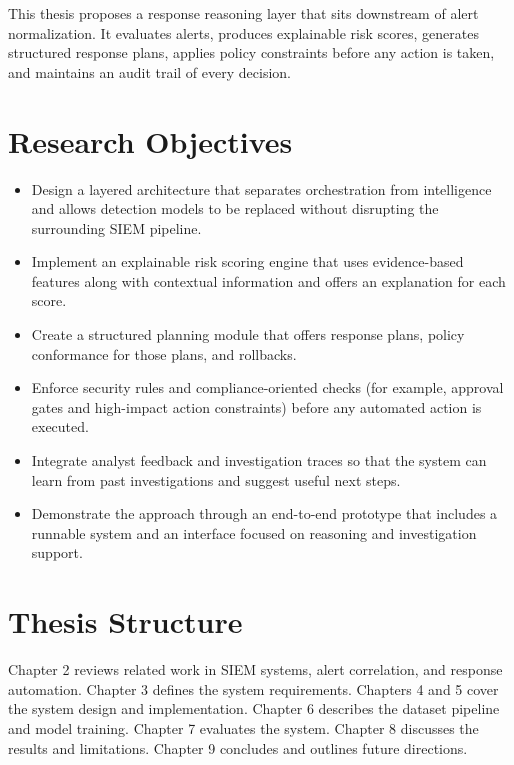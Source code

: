 This thesis proposes a response reasoning layer that sits downstream of alert normalization. It evaluates alerts, produces explainable risk scores, generates structured response plans, applies policy constraints before any action is taken, and maintains an audit trail of every decision.

\section{Research Objectives}

\begin{itemize}
    \item Design a layered architecture that separates orchestration from intelligence and allows detection models to be replaced without disrupting the surrounding SIEM pipeline.
    \item Implement an explainable risk scoring engine that uses evidence-based features along with contextual information and offers an explanation for each score.
    \item Create a structured planning module that offers response plans, policy conformance for those plans, and rollbacks.
    \item Enforce security rules and compliance-oriented checks (for example, approval gates and high-impact action constraints) before any automated action is executed.
    \item Integrate analyst feedback and investigation traces so that the system can learn from past investigations and suggest useful next steps.
    \item Demonstrate the approach through an end-to-end prototype that includes a runnable system and an interface focused on reasoning and investigation support.
\end{itemize}

\section{Thesis Structure}

Chapter 2 reviews related work in SIEM systems, alert correlation, and response automation. Chapter 3 defines the system requirements. Chapters 4 and 5 cover the system design and implementation. Chapter 6 describes the dataset pipeline and model training. Chapter 7 evaluates the system. Chapter 8 discusses the results and limitations. Chapter 9 concludes and outlines future directions.

